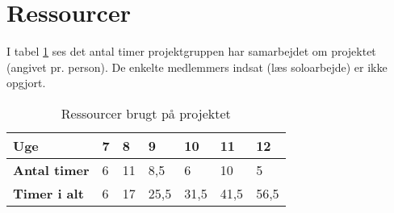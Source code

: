\section{Ressourcer}
I tabel \ref{table:ressourcer} ses det antal timer projektgruppen har samarbejdet om projektet (angivet pr. person). De enkelte medlemmers indsat (læs soloarbejde) er ikke opgjort.\\

\begin{table}[h]
    \centering
    \begin{tabular}{|p{3cm}|p{1cm}|p{1cm}|p{1cm}|p{1cm}|p{1cm}|p{1cm}|} 
        \hline
        \textbf{Uge}         & \textbf{7} & \textbf{8} & \textbf{9} & \textbf{10} & \textbf{11} & \textbf{12}   \\ 
        \hline
        \textbf{Antal timer} & 6          & 11         & 8,5        & 6           & 10          & 5            \\ 
        \hline
        \textbf{Timer i alt} & 6          & 17         & 25,5       & 31,5        & 41,5        & 56,5          \\
        \hline
    \end{tabular}
    \caption{Ressourcer brugt på projektet}
    \label{table:ressourcer}
\end{table}
